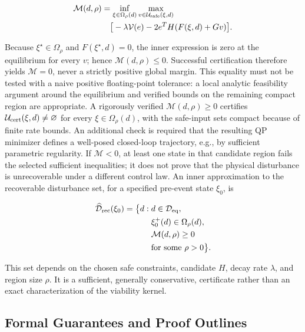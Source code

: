 \documentclass[11pt,twocolumn]{article}
\begin{document}
\begin{equation}\label{eq:margin}
\begin{aligned}
\mathcal M(d,\rho)
&=\inf_{\xi\in\Omega_\rho(d)}
\max_{v\in\mathcal U_{\rm safe}(\xi,d)}\\
&\quad\big[-\lambda\mathcal V(e)
-2e^TH(F(\xi,d)+Gv)\big].
\end{aligned}
\end{equation}

Because $\xi^\star\in\Omega_\rho$ and $F(\xi^\star,d)=0$, the inner expression is zero at the equilibrium for every $v$; hence $\mathcal M(d,\rho)\leq0$. Successful certification therefore yields $\mathcal M=0$, never a strictly positive global margin. This equality must not be tested with a naive positive floating-point tolerance: a local analytic feasibility argument around the equilibrium and verified bounds on the remaining compact region are appropriate. A rigorously verified $\mathcal M(d,\rho)\geq0$ certifies $\mathcal U_{\rm cert}(\xi,d)\ne\varnothing$ for every $\xi\in\Omega_\rho(d)$, with the safe-input sets compact because of finite rate bounds. An additional check is required that the resulting QP minimizer defines a well-posed closed-loop trajectory, e.g., by sufficient parametric regularity. If $\mathcal M<0$, at least one state in that candidate region fails the selected sufficient inequalities; it does not prove that the physical disturbance is unrecoverable under a different control law. An inner approximation to the recoverable disturbance set, for a specified pre-event state $\xi_0$, is

\begin{equation}\label{eq:drec}
\begin{aligned}
\widehat{\mathcal D}_{\rm rec}(\xi_0)=\big\{d:\;&d\in\mathcal D_{\rm eq},\\
&\xi_0^+(d)\in\Omega_\rho(d),\\
&\mathcal M(d,\rho)\geq0\\
&\text{for some }\rho>0\big\}.
\end{aligned}
\end{equation}

This set depends on the chosen safe constraints, candidate $H$, decay rate $\lambda$, and region size $\rho$. It is a sufficient, generally conservative, certificate rather than an exact characterization of the viability kernel.

\subsection{Formal Guarantees and Proof Outlines}
\end{document}
